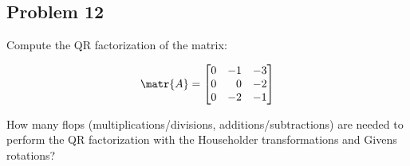 \subsection{Problem 12}

Compute the QR factorization of the matrix:

\begin{equation*}
    \matr{A} = 
    \begin{bmatrix}
    0 & -1 & -3  \\
    0 & \phantom{-}0 & -2 \\
    0 & -2 & -1 
    \end{bmatrix}
\end{equation*}

How many flops (multiplications/divisions, additions/subtractions) are needed to perform the QR factorization with the Householder transformations and Givens rotations?